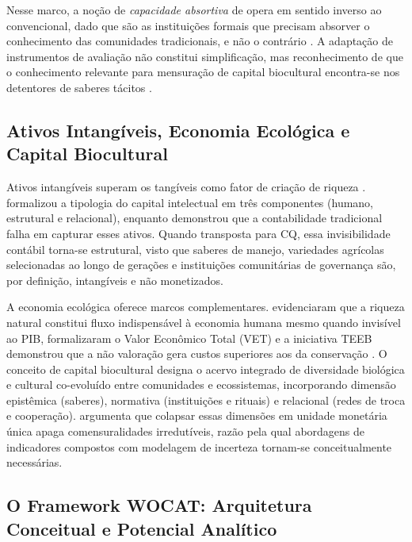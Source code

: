 \documentclass[3p,times]{elsarticle}
\begin{document}
Nesse marco, a noção de \textit{capacidade absortiva} de \citet{CohenLevinthal1990} opera em sentido inverso ao convencional, dado que são as instituições formais que precisam absorver o conhecimento das comunidades tradicionais, e não o contrário \citep{Santos2007}. A adaptação de instrumentos de avaliação não constitui simplificação, mas reconhecimento de que o conhecimento relevante para mensuração de capital biocultural encontra-se nos detentores de saberes tácitos \citep{FalsBorda1991}.

\subsection{Ativos Intangíveis, Economia Ecológica e Capital Biocultural}

Ativos intangíveis superam os tangíveis como fator de criação de riqueza \citep{Lev2001}. \citet{Sveiby1997} formalizou a tipologia do capital intelectual em três componentes (humano, estrutural e relacional), enquanto \citet{Edvinsson1997} demonstrou que a contabilidade tradicional falha em capturar esses ativos. Quando transposta para CQ, essa invisibilidade contábil torna-se estrutural, visto que saberes de manejo, variedades agrícolas selecionadas ao longo de gerações e instituições comunitárias de governança são, por definição, intangíveis e não monetizados.

A economia ecológica oferece marcos complementares. \citet{Costanza1997} evidenciaram que a riqueza natural constitui fluxo indispensável à economia humana mesmo quando invisível ao PIB, \citet{PearceTurner1990} formalizaram o Valor Econômico Total (VET) e a iniciativa TEEB demonstrou que a não valoração gera custos superiores aos da conservação \citep{TEEB2010}. O conceito de capital biocultural \citep{Maffi2001,Pretty2009} designa o acervo integrado de diversidade biológica e cultural co-evoluído entre comunidades e ecossistemas, incorporando dimensão epistêmica (saberes), normativa (instituições e rituais) e relacional (redes de troca e cooperação). \citet{MartinezAlier2002} argumenta que colapsar essas dimensões em unidade monetária única apaga comensuralidades irredutíveis, razão pela qual abordagens de indicadores compostos com modelagem de incerteza tornam-se conceitualmente necessárias.

\subsection{O Framework WOCAT: Arquitetura Conceitual e Potencial Analítico}
\end{document}
